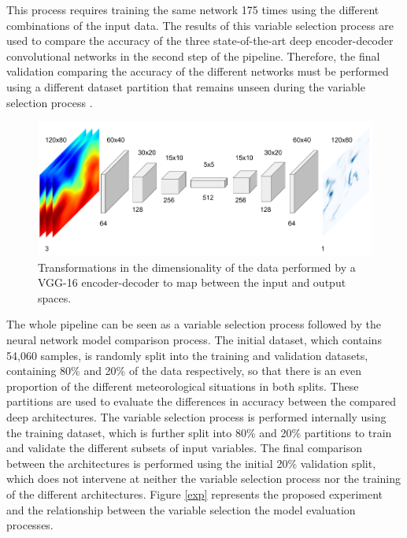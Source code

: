 \documentclass[twocol]{ametsoc}
\begin{document}
This process requires training the same network 175 times using the different combinations of the input data. The results of this variable selection process are used to compare the accuracy of the three state-of-the-art deep encoder-decoder convolutional networks in the second step of the pipeline. Therefore, the final validation comparing the accuracy of the different networks must be performed using a different dataset partition that remains unseen during the variable selection process  \citep{reunanen2003overfitting}.

\begin{figure}[h]
 \centerline{\includegraphics[width=13cm]{vgg16_enc.png}}
  \caption{Transformations in the dimensionality of the data performed by a VGG-16 encoder-decoder to map between the input and output spaces.}\label{vgg16}
\end{figure}

The whole pipeline can be seen as a variable selection process followed by the neural network model comparison process. The initial dataset, which contains 54,060 samples, is randomly split into the training and validation datasets, containing 80\% and 20\% of the data respectively, so that there is an even proportion of the different meteorological situations in both splits. These partitions are used to evaluate the differences in accuracy between the compared deep architectures. The variable selection process is performed internally using the training dataset, which is further split into 80\% and 20\% partitions to train and validate the different subsets of input variables. The final comparison between the architectures is performed using the initial 20\% validation split, which does not intervene at neither the variable selection process nor the training of the different architectures. Figure \ref{exp} represents the proposed experiment and the relationship between the variable selection the model evaluation processes. 
\end{document}
